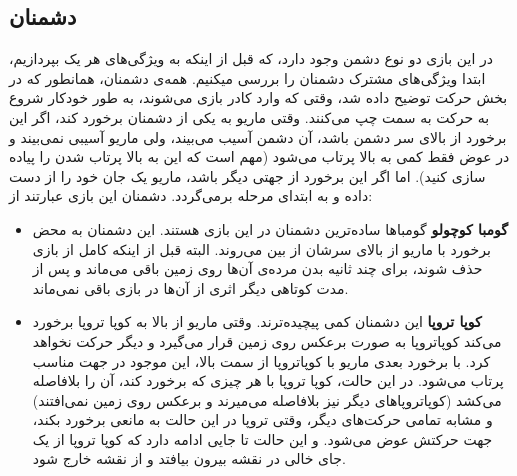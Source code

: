 \documentclass{utap}
\begin{document}
	\subsection{دشمنان}
در این بازی دو نوع دشمن وجود دارد، که قبل از اینکه به ویژگی‌های هر یک بپردازیم، ابتدا ویژگی‌های مشترک دشمنان را بررسی میکنیم.
همه‌ی دشمنان، همانطور که در بخش حرکت توضیح داده شد، وقتی که وارد کادر بازی می‌شوند، به طور خودکار شروع به حرکت به سمت چپ می‌کنند.
وقتی ماریو به یکی از دشمنان برخورد کند، اگر این برخورد از بالای سر دشمن باشد، آن دشمن آسیب می‌بیند، ولی ماریو آسیبی نمی‌بیند و در عوض فقط کمی به بالا پرتاب می‌شود (مهم است که این به بالا پرتاب شدن را پیاده سازی کنید). اما اگر این برخورد از جهتی دیگر باشد، ماریو یک جان خود را از دست داده و به ابتدای مرحله برمی‌گردد. دشمنان این بازی عبارتند از:
	\begin{itemize}
		\item
\textbf{گومبا کوچولو}
گومباها ساده‌ترین دشمنان در این بازی هستند. این دشمنان به محض برخورد با ماریو از بالای سرشان از بین می‌روند. البته قبل از اینکه کامل از بازی حذف شوند، برای چند ثانیه بدن مرده‌ی آن‌ها روی زمین باقی می‌ماند و پس از مدت کوتاهی دیگر اثری از آن‌ها در بازی باقی نمی‌ماند.
		\item
\textbf{کوپا تروپا}
این دشمنان کمی پیچیده‌ترند. وقتی ماریو از بالا به کوپا تروپا برخورد می‌کند کوپاتروپا به صورت برعکس روی زمین قرار می‌گیرد و دیگر حرکت نخواهد کرد. با برخورد بعدی ماریو با کوپا‌تروپا از سمت بالا، این موجود در جهت مناسب پرتاب می‌شود. در این حالت، کوپا تروپا با هر چیزی که برخورد کند، آن را بلافاصله می‌کشد (کوپاتروپاهای دیگر نیز بلافاصله می‌میرند و برعکس روی زمین نمی‌افتند) و مشابه تمامی حرکت‌های دیگر، وقتی تروپا در این حالت به مانعی برخورد بکند، جهت حرکتش عوض می‌شود. و این حالت تا جایی ادامه دارد که کوپا تروپا از یک جای خالی در نقشه بیرون بیافتد و از نقشه خارج شود.
	\end{itemize}
\end{document}
